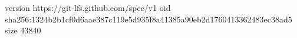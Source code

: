 version https://git-lfs.github.com/spec/v1
oid sha256:1324b2b1cf0d6aae387c119e5d935f8a41385a90eb2d1760413362483ec38ad5
size 43840
